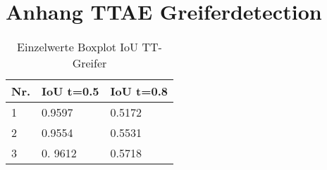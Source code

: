 \chapter{Anhang TTAE Greiferdetection}
\label{appendix:TTAEGreifer }

	
	
	\begin{table}[ht]
		\centering
		\begin{tabularx}{\textwidth}{lll}
			\textbf{Nr.}  & \textbf{IoU t=0.5} & \textbf{IoU t=0.8}  	 \\ \hline 
			1 & 0.9597 & 0.5172  \\
			2 & 0.9554 & 0.5531 \\
			3 & 0. 9612 & 0.5718 \\
		\end{tabularx}
		\caption{Einzelwerte Boxplot IoU TT-Greifer}
		\label{table:EinzelwerteBoxplotIoUTTGreifer}
	\end{table}